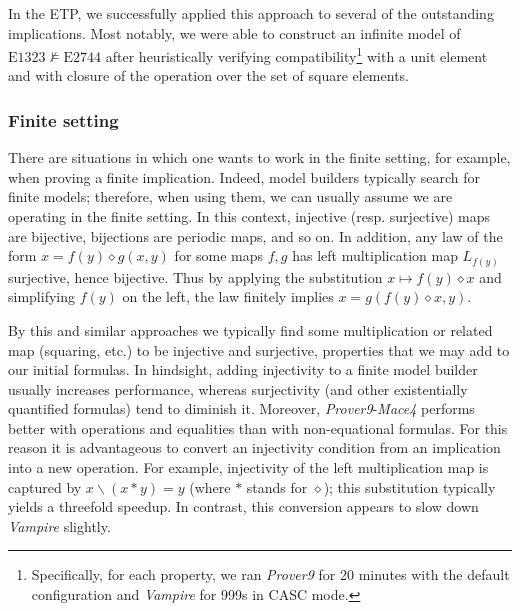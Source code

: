 \documentclass[12pt]{amsart}
\theoremstyle{definition}
\newcommand{\op}{\diamond}
\newcommand{\nmodels}{\not\models}
\newcommand{\Eq}[1]{\mathrm{E}#1}
\begin{document}
In the ETP, we successfully applied this approach to several of the outstanding implications. Most notably, we were able to construct an infinite model of $\Eq{1323}\nmodels\Eq{2744}$ after heuristically verifying compatibility\footnote{Specifically, for each property, we ran \emph{Prover9} for 20 minutes with the default configuration and \emph{Vampire} for 999s in CASC mode.} with a unit element and with closure of the operation over the set of square elements.

\subsubsection{Finite setting}\label{finite setting}

There are situations in which one wants to work in the finite setting, for example, when proving a finite implication. Indeed, model builders typically search for finite models; therefore, when using them, we can usually assume we are operating in the finite setting. In this context, injective (resp. surjective) maps are bijective, bijections are periodic maps, and so on. In addition, any law of the form $x = f(y)\op g(x,y)$ for some maps $f,g$ has left multiplication map $L_{f(y)}$ surjective, hence bijective. Thus by applying the substitution $x\mapsto f(y)\op x$ and simplifying $f(y)$ on the left, the law finitely implies $x = g(f(y)\op x,y)$.

By this and similar approaches we typically find some multiplication or related map (squaring, etc.) to be injective and surjective, properties that we may add to our initial formulas. In hindsight, adding injectivity to a finite model builder usually increases performance, whereas surjectivity (and other existentially quantified formulas) tend to diminish it. Moreover, \emph{Prover9}-\emph{Mace4} performs better with operations and equalities than with non-equational formulas. For this reason it is advantageous to convert an injectivity condition from an implication into a new operation. For example, injectivity of the left multiplication map is captured by $x \backslash (x * y) = y$ (where $*$ stands for $\op$); this substitution typically yields a threefold speedup. In contrast, this conversion appears to slow down \emph{Vampire} slightly.
\end{document}
